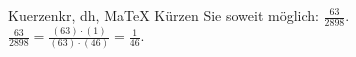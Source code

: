 \begin{MAufgabe}{Kuerzen}{kr, dh, MaTeX}
K\"urzen Sie soweit m\"oglich: $\frac{63}{2898}$.\\ 
\ifLsg\MLoesung
\quad $\frac{63}{2898}=\frac{(63)\cdot(1)}{(63)\cdot(46)}=\frac{1}{46}$.\else\relax\fi
 \end{MAufgabe}